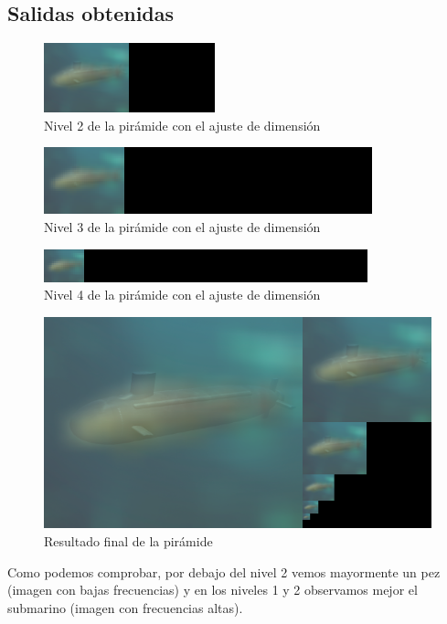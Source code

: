 \subsection{Salidas obtenidas}

		\begin{figure}[H]
		\centering
		\includegraphics[width=1\linewidth]{nivel2pyr}
		\caption{Nivel 2 de la pirámide con el ajuste de dimensión}
		\label{fig:freq_altasB}
		\end{figure}
	
		\begin{figure}[H]
		\centering
		\includegraphics[width=1\linewidth]{nivel3pyr}
		\caption{Nivel 3 de la pirámide con el ajuste de dimensión}
		\label{fig:freq_altasB}
		\end{figure}
	
		\begin{figure}[H]
		\centering
		\includegraphics[width=1\linewidth]{nivel4pyr}
		\caption{Nivel 4 de la pirámide con el ajuste de dimensión}
		\label{fig:freq_altasB}
		\end{figure}
			
		\begin{figure}[H]
			\centering
			\includegraphics[width=1\linewidth]{piramide}
			\caption{Resultado final de la pirámide}
			\label{fig:freq_altasB}
		\end{figure}

Como podemos comprobar, por debajo del nivel 2 vemos mayormente un pez (imagen con bajas frecuencias) y en los niveles 1 y 2 observamos mejor el submarino (imagen con frecuencias altas).
